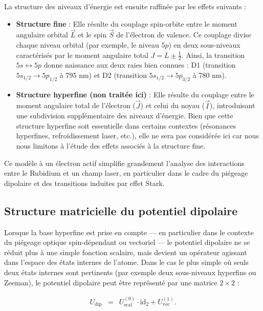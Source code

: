 La structure des niveaux d’énergie est ensuite raffinée par les effets suivants :
\begin{itemize}
  \item \textbf{Structure fine} : Elle résulte du couplage spin-orbite entre le moment angulaire orbital $\vec{L}$ et le spin $\vec{S}$ de l’électron de valence. Ce couplage divise chaque niveau orbital (par exemple, le niveau $5p$) en deux sous-niveaux caractérisés par le moment angulaire total $J = L \pm \tfrac{1}{2}$. Ainsi, la transition $5s \leftrightarrow 5p$ donne naissance aux deux raies bien connues : D1 (transition $5s_{1/2} \to 5p_{1/2}$ à 795 nm) et D2 (transition $5s_{1/2} \to 5p_{3/2}$ à 780 nm).
  
  \item \textbf{Structure hyperfine (non traitée ici)} : Elle résulte du couplage entre le moment angulaire total de l’électron ($\vec{J}$) et celui du noyau ($\vec{I}$), introduisant une subdivision supplémentaire des niveaux d’énergie. Bien que cette structure hyperfine soit essentielle dans certains contextes (résonances hyperfines, refroidissement laser, etc.), elle ne sera pas considérée ici car nous nous limitons à l’étude des effets associés à la structure fine.
\end{itemize}

Ce modèle à un électron actif simplifie grandement l’analyse des interactions entre le Rubidium et un champ laser, en particulier dans le cadre du piégeage dipolaire et des transitions induites par effet Stark.


\subsection{Structure matricielle du potentiel dipolaire}

Lorsque la base hyperfine est prise en compte — en particulier dans le contexte du piégeage optique spin-dépendant ou vectoriel — le potentiel dipolaire ne se réduit plus à une simple fonction scalaire, mais devient un opérateur agissant dans l’espace des états internes de l’atome. Dans le cas le plus simple où seuls deux états internes sont pertinents (par exemple deux sous-niveaux hyperfins ou Zeeman), le potentiel dipolaire peut être représenté par une matrice $2 \times 2$ :

\begin{eqnarray}
U_{\mathrm{dip}} &=& U_{\mathrm{scal}}^{(0)} \cdot \mbox{id}_2 
+ U_{\mathrm{vec}}^{(1)}.
\end{eqnarray}

